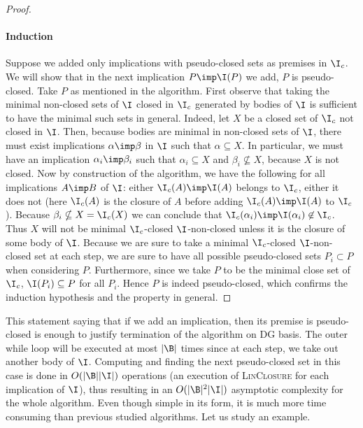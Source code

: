 \begin{proof}
	\paragraph{Induction} Suppose we added only implications with pseudo-closed 
	sets as premises in $\I_c$. We will show that in the next implication $P 
	\imp 
	\I(P)$ we add, $P$ is pseudo-closed. Take $P$ as mentioned in the algorithm.
	First observe that taking the minimal non-closed sets of $\I$ closed in 
	$\I_c$
	generated by bodies of $\I$ is sufficient to have the minimal such sets in 
	general. Indeed, let $X$ be a closed set of $\I_c$ not closed in $\I$. Then,
	because bodies are minimal in non-closed sets of $\I$, there must exist 
	implications $\alpha \imp \beta$ in $\I$ such that $\alpha \subseteq X$.
	In particular, we must have an implication $\alpha_i \imp \beta_i$ such 
	that 
	$\alpha_i \subseteq X$ and $\beta_i \nsubseteq X$, because $X$ is not 
	closed. 
	Now by construction of the algorithm, we have the following for all 
	implications $A \imp B$ of $\I$: either $\I_c(A) \imp \I(A)$ belongs to 
	$\I_c$, 
	either it does not (here $\I_c(A)$ is the closure of $A$ before adding 
	$\I_c(A) \imp \I(A)$ to $\I_c$). Because $\beta_i \nsubseteq X = 
	\I_c(X)$ we can conclude that $\I_c(\alpha_i) \imp \I(\alpha_i) \not\in 
	\I_c$.
	Thus $X$ will not be minimal $\I_c$-closed $\I$-non-closed unless it is the 
	closure of some body of $\I$.
	Because we are sure to take a minimal $\I_c$-closed $\I$-non-closed set at 
	each step, we are sure to have all possible pseudo-closed sets $P_i \subset 
	P$
	when considering $P$. Furthermore, since we take $P$ to be the minimal close
	set of $\I_c$, $\I(P_i) \subseteq P$ for all $P_i$. Hence $P$ is indeed 
	pseudo-closed, which confirms the induction hypothesis and the property in
	general.
	
\end{proof}

This statement saying that if we add an implication, then its premise is 
pseudo-closed is enough to justify termination of the algorithm on DG
basis. The outer while loop will be executed at most $|\B|$ times since at
each step, we take out another body of $\I$. Computing and finding the next
pseudo-closed set in this case is done in $O(|\B||\I|)$ operations (an 
execution of \textsc{LinClosure} for each implication of $\I$), thus resulting
in an $O(|\B|^2|\I|)$ asymptotic complexity for the whole algorithm. Even though
simple in its form, it is much more time consuming than previous studied 
algorithms. Let us study an example.

